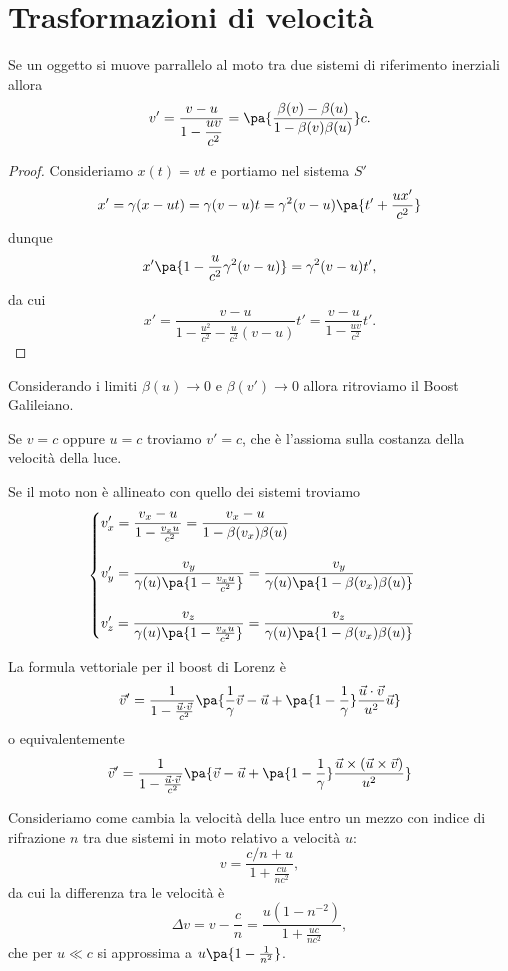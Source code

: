 \section{Trasformazioni di velocit\`a}
\begin{proposition}\label{FormulaBoost}
Se un oggetto si muove parrallelo al moto tra due sistemi di riferimento inerziali allora
\[v'=\dfrac{v-u}{\displaystyle 1-\frac{uv}{c^2}}=\pa{\frac{\beta(v)-\beta(u)}{1-\beta(v)\beta(u)}}c.\]
\end{proposition}
\begin{proof}
Consideriamo $x(t)=vt$ e portiamo nel sistema $S'$
\[x'=\gamma(x-ut)=\gamma(v-u)t=\gamma^2(v-u)\pa{t'+\frac{ux'}{c^2}}\]
dunque
\[x'\pa{1-\frac u{c^2}\gamma^2(v-u)}=\gamma^2(v-u)t',\]
da cui 
\[x'=\frac{v-u}{1-\frac{u^2}{c^2}-\frac u{c^2}(v-u)}t'=\frac{v-u}{1-\frac{uv}{c^2}}t'.\]
\end{proof}

\begin{remark}
Considerando i limiti $\beta(u)\to 0$ e $\beta(v')\to 0$ allora ritroviamo il Boost Galileiano.
\end{remark}

\begin{remark}
Se $v=c$ oppure $u=c$ troviamo $v'=c$, che \`e l'assioma sulla costanza della velocit\`a della luce.
\end{remark}

\begin{remark}
Se il moto non \`e allineato con quello dei sistemi troviamo
\[\begin{cases}
\displaystyle v_x'=\frac{v_x-u}{1-\frac{v_x u}{c^2}}=\frac{v_x-u}{1-\beta(v_x)\beta(u)}\\\\
\displaystyle v_y'=\dfrac{v_y}{\gamma(u)\pa{1-\frac{v_x u}{c^2}}}=\frac{v_y}{\gamma(u)\pa{1-\beta(v_x)\beta(u)}}\\\\
\displaystyle v_z'=\dfrac{v_z}{\gamma(u)\pa{1-\frac{v_x u}{c^2}}}=\frac{v_z}{\gamma(u)\pa{1-\beta(v_x)\beta(u)}}
\end{cases}\]
\end{remark}

\noindent La formula vettoriale per il boost di Lorenz \`e
\[\vec v'=\frac1{1-\frac{\vec u\cdot \vec v}{c^2}}\pa{\frac1\gamma \vec v-\vec u+\pa{1-\frac1\gamma}\frac{\vec u\cdot \vec v}{u^2}\vec u}\]
o equivalentemente
\[\vec v'=\frac1{1-\frac{\vec u\cdot \vec v}{c^2}}\pa{\vec v-\vec u+\pa{1-\frac1\gamma} \frac{\vec u\times (\vec u\times \vec v)}{u^2}}\]


\begin{example}
Consideriamo come cambia la velocit\`a della luce entro un mezzo con indice di rifrazione $n$ tra due sistemi in moto relativo a velocit\`a $u$:
\[v=\frac{c/n+u}{1+\frac{cu}{nc^2}},\]
da cui la differenza tra le velocit\`a \`e
\[\Delta v=v-\frac cn=\frac{u(1-n^{-2})}{1+\frac{uc}{nc^2}},\]
che per $u\ll c$ si approssima a $u\pa{1-\frac1{n^2}}$.
\end{example}

